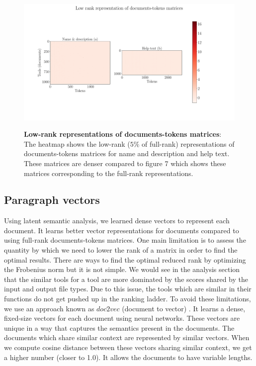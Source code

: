 \begin{figure}[h]
\begin{centering}
    {\includegraphics[scale=0.35]{figures/Document_tokens_low_rank.pdf}}
    \caption[Low-rank representations of documents-tokens matrices]{\textbf{Low-rank representations of documents-tokens matrices}: The heatmap shows the low-rank ($5\%$ of full-rank) representations of documents-tokens matrices for name and description and help text. These matrices are denser compared to figure 7 which shows these matrices corresponding to the full-rank representations.}
\end{centering}
\end{figure}

\subsection{Paragraph vectors}
Using latent semantic analysis, we learned dense vectors to represent each document. It learns better vector representations for documents compared to using full-rank documents-tokens matrices. One main limitation is to assess the quantity by which we need to lower the rank of a matrix in order to find the optimal results. There are ways to find the optimal reduced rank by optimizing the Frobenius norm but it is not simple. We would see in the analysis section that the similar tools for a tool are more dominated by the scores shared by the input and output file types. Due to this issue, the tools which are similar in their functions do not get pushed up in the ranking ladder. To avoid these limitations, we use an approach known as $doc2vec$ (document to vector) \cite{DBLP:journals/corr/LeM14}. It learns a dense, fixed-size vectors for each document using neural networks. These vectors are unique in a way that captures the semantics present in the documents. The documents which share similar context are represented by similar vectors. When we compute cosine distance between these vectors sharing similar context, we get a higher number (closer to 1.0). It allows the documents to have variable lengths.


